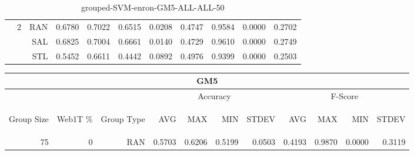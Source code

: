 \begin{center}
\begin{table}[htbp]
\begin{center}
\begin{tabular}{ | r | r | r | r | r | r | r | r | r | r | r |}
 & \multirow{3}{*}{2} & RAN & 0.6780 & 0.7022 & 0.6515 & 0.0208 & 0.4747 & 0.9584 & 0.0000 & 0.2702\\ \cline{3-11}
 &   & SAL & 0.6825 & 0.7004 & 0.6661 & 0.0140 & 0.4729 & 0.9610 & 0.0000 & 0.2749\\ \cline{3-11}
 &   & STL & 0.5452 & 0.6611 & 0.4442 & 0.0892 & 0.4976 & 0.9399 & 0.0000 & 0.2503\\ \cline{2-11}
\hline
\end{tabular}
\caption{grouped-SVM-enron-GM5-ALL-ALL-50}
\end{center}
 \end{table}
\end{center}

\begin{center}
\begin{table}[htbp] 
 \begin{center}
\begin{tabular}{ | r | r | r | r | r | r | r | r | r | r | r |}
\hline
\multicolumn{11}{|c|}{GM5}\\
\hline
 & & & \multicolumn{4}{|c|}{Accuracy} & \multicolumn{4}{|c|}{F-Score}\\ \cline{4-11}
\begin{sideways}Group Size\end{sideways} & \begin{sideways}Web1T \%\end{sideways} & \begin{sideways}Group Type\end{sideways} & \begin{sideways}AVG\end{sideways} & \begin{sideways}MAX\end{sideways} & \begin{sideways}MIN\end{sideways} & \begin{sideways}STDEV\end{sideways} & \begin{sideways}AVG\end{sideways} & \begin{sideways}MAX\end{sideways} & \begin{sideways}MIN\end{sideways} & \begin{sideways}STDEV\end{sideways}\\
\hline
\multirow{9}{*}{75}
 & \multirow{3}{*}{0} & RAN & 0.5703 & 0.6206 & 0.5199 & 0.0503 & 0.4193 & 0.9870 & 0.0000 & 0.3119\\ \cline{3-11}

\end{tabular}
\end{center}
\end{table}
\end{center}
